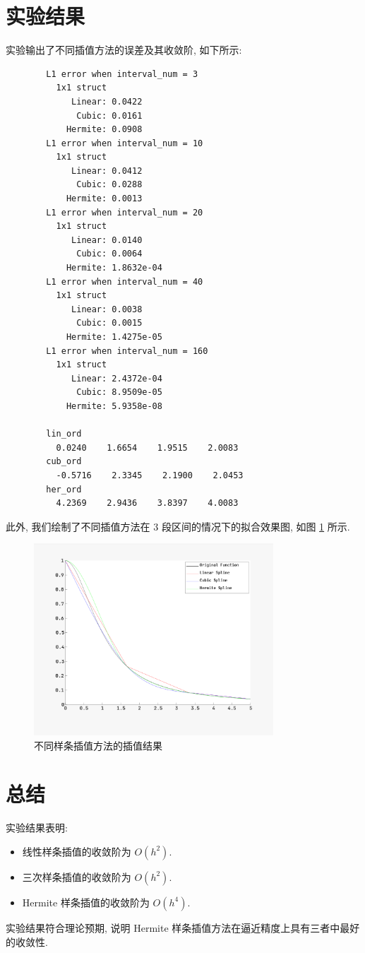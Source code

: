 \documentclass[12pt]{article}
\begin{document}
\section{实验结果}
	实验输出了不同插值方法的误差及其收敛阶, 如下所示:
	\begin{verbatim}
		L1 error when interval_num = 3
		  1x1 struct
		     Linear: 0.0422
		      Cubic: 0.0161
		    Hermite: 0.0908
		L1 error when interval_num = 10
		  1x1 struct
		     Linear: 0.0412
		      Cubic: 0.0288
		    Hermite: 0.0013
		L1 error when interval_num = 20
		  1x1 struct
		     Linear: 0.0140
		      Cubic: 0.0064
		    Hermite: 1.8632e-04
		L1 error when interval_num = 40
		  1x1 struct
		     Linear: 0.0038
		      Cubic: 0.0015
		    Hermite: 1.4275e-05
		L1 error when interval_num = 160
		  1x1 struct
		     Linear: 2.4372e-04
		      Cubic: 8.9509e-05
		    Hermite: 5.9358e-08

		lin_ord
		  0.0240    1.6654    1.9515    2.0083
		cub_ord
		  -0.5716    2.3345    2.1900    2.0453
		her_ord
		  4.2369    2.9436    3.8397    4.0083
	\end{verbatim}

此外, 我们绘制了不同插值方法在 $3$ 段区间的情况下的拟合效果图, 如图 \ref{fig:interpolation} 所示.

\begin{figure}[ht]
	\centering
	\includegraphics[width=0.8\textwidth]{figure/result.png}
	\caption{不同样条插值方法的插值结果}
	\label{fig:interpolation}
\end{figure}

\section{总结}
	实验结果表明:
	\begin{itemize}
		\item 线性样条插值的收敛阶为 $O(h^2)$.
		\item 三次样条插值的收敛阶为 $O(h^2)$.
		\item Hermite 样条插值的收敛阶为 $O(h^4)$.
	\end{itemize}
	实验结果符合理论预期, 说明 Hermite 样条插值方法在逼近精度上具有三者中最好的收敛性.
\end{document}
